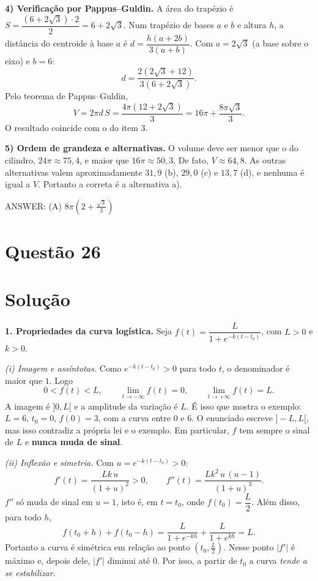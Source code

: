 \documentclass{article}%
\begin{document}
\textbf{4) Verificação por Pappus--Guldin.} A área do trapézio é $S=\dfrac{(6+2\sqrt{3})\cdot 2}{2}=6+2\sqrt{3}$. Num trapézio de bases $a$ e $b$ e altura $h$, a distância do centroide à base $a$ é $d=\dfrac{h(a+2b)}{3(a+b)}$. Com $a=2\sqrt{3}$ (a base sobre o eixo) e $b=6$:
\[
d=\frac{2(2\sqrt{3}+12)}{3(6+2\sqrt{3})}.
\]
Pelo teorema de Pappus--Guldin,
\[
V=2\pi d\,S=\frac{4\pi(12+2\sqrt{3})}{3}=16\pi+\frac{8\pi\sqrt{3}}{3}.
\]
O resultado coincide com o do item 3.

\textbf{5) Ordem de grandeza e alternativas.} O volume deve ser menor que o do cilindro, $24\pi\approx 75{,}4$, e maior que $16\pi\approx 50{,}3$. De fato, $V\approx 64{,}8$. As outras alternativas valem aproximadamente $31{,}9$ (b), $29{,}0$ (c) e $13{,}7$ (d), e nenhuma é igual a $V$. Portanto a correta é a alternativa a).

ANSWER: (A) $8\pi\left(2+\frac{\sqrt{3}}{3}\right)$%
\newpage%
\section*{Questão 26}

\section*{Solução}

\textbf{1. Propriedades da curva logística.} Seja $f(t)=\dfrac{L}{1+e^{-k(t-t_0)}}$, com $L>0$ e $k>0$.

\emph{(i) Imagem e assíntotas.} Como $e^{-k(t-t_0)}>0$ para todo $t$, o denominador é maior que $1$. Logo
\[
0<f(t)<L,\qquad \lim_{t\to-\infty}f(t)=0,\qquad \lim_{t\to+\infty}f(t)=L .
\]
A imagem é $]0,L[$ e a amplitude da variação é $L$. É isso que mostra o exemplo: $L=6$, $t_0=0$, $f(0)=3$, com a curva entre $0$ e $6$. O enunciado escreve $]-L,L[$, mas isso contradiz a própria lei e o exemplo. Em particular, $f$ tem sempre o sinal de $L$ e \textbf{nunca muda de sinal}.

\emph{(ii) Inflexão e simetria.} Com $u=e^{-k(t-t_0)}>0$:
\[
f'(t)=\frac{Lk\,u}{(1+u)^2}>0,\qquad f''(t)=\frac{Lk^2\,u\,(u-1)}{(1+u)^3}.
\]
$f''$ só muda de sinal em $u=1$, isto é, em $t=t_0$, onde $f(t_0)=\dfrac{L}{2}$. Além disso, para todo $h$,
\[
f(t_0+h)+f(t_0-h)=\frac{L}{1+e^{-kh}}+\frac{L}{1+e^{kh}}=L .
\]
Portanto a curva é simétrica em relação ao ponto $\left(t_0,\tfrac{L}{2}\right)$. Nesse ponto $|f'|$ é máximo e, depois dele, $|f'|$ diminui até $0$. Por isso, a partir de $t_0$ a curva \emph{tende a se estabilizar}.
\end{document}
